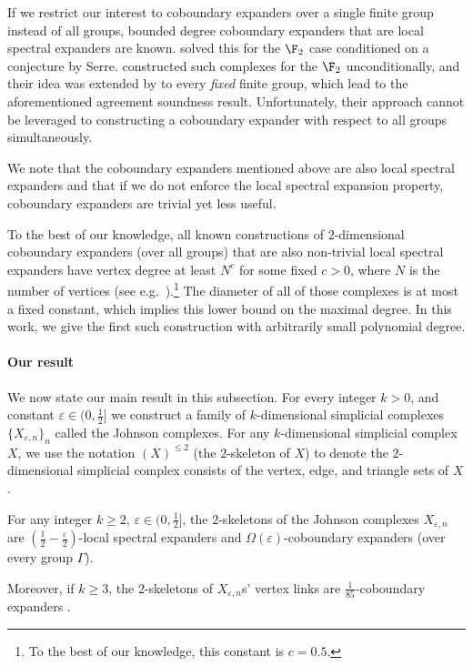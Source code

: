 If we restrict our interest to coboundary expanders over a single finite group instead of all groups, bounded degree coboundary expanders that are local spectral expanders are known. \cite{KaufmanKL2016} solved this for the \(\F_2\) case conditioned on a conjecture by Serre. \cite{ChapmanL2023} constructed such complexes for the \(\F_2\) unconditionally, and their idea was extended by \cite{DiksteinDL2024,BafnaM2024} to every \emph{fixed} finite group, which lead to the aforementioned agreement soundness result. Unfortunately, their approach cannot be leveraged to constructing a coboundary expander with respect to all groups simultaneously.

 We note that the coboundary expanders mentioned above are also local spectral expanders and that if we do not enforce the local spectral expansion property, coboundary expanders are trivial yet less useful.
 
 To the best of our knowledge, all known constructions of $2$-dimensional coboundary expanders (over all groups) that are also non-trivial local spectral expanders have vertex degree at least $N^{c}$ for some fixed $c>0$, where $N$ is the number of vertices (see e.g.\ \cite{LubotzkySV2005,kaufmanO2018}).\footnote{To the best of our knowledge, this constant is \(c=0.5\).} The diameter of all of those complexes is at most a fixed constant, which implies this lower bound on the maximal degree. In this work, we give the first such construction with arbitrarily small polynomial degree.

\paragraph{Our result} We now state our main result in this subsection. For every integer $k>0$, and constant $\varepsilon \in (0,\frac{1}{2}]$ we construct a family of $k$-dimensional simplicial complexes $\{X_{\varepsilon,n}\}_n$ called the Johnson complexes. For any $k$-dimensional simplicial complex $X$, we use the notation $(X)^{\le 2}$ (the $2$-skeleton of $X$) to denote the $2$-dimensional simplicial complex consists of the vertex, edge, and triangle sets of $X$.
\begin{theorem} \label{thm:inf-Johnson-complex-expansions}
For any integer $k\ge 2$, $\varepsilon \in (0,\frac{1}{2}]$, the $2$-skeletons of the Johnson complexes $X_{\varepsilon,n}$ are $\left(\frac{1}{2} - \frac{\varepsilon}{2}\right)$-local spectral expanders and $\Omega(\varepsilon)$-coboundary expanders (over every group $\Gamma$).

Moreover, if $k\ge 3$, the $2$-skeletons of $X_{\varepsilon,n}$s' vertex links are $\frac{1}{85}$-coboundary expanders . 
\end{theorem}

